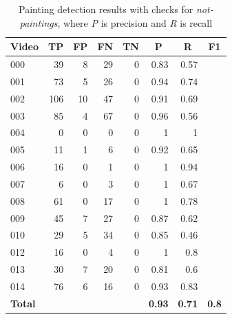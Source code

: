 \documentclass[10pt,twocolumn,letterpaper]{article}
\begin{document}
\begin{table}[]
\begin{center}
\begin{tabular}{lrrrrrrr}
\multicolumn{1}{c}{\textbf{Video}} & \multicolumn{1}{c}{\textbf{TP}} & \multicolumn{1}{c}{\textbf{FP}} & \multicolumn{1}{c}{\textbf{FN}} & \multicolumn{1}{c}{\textbf{TN}} & \multicolumn{1}{c}{\textbf{P}} & \multicolumn{1}{c}{\textbf{R}} & \multicolumn{1}{c}{\textbf{F1}} \\ \hline \hline
000 & 39 & 8 & 29 & 0 & 0.83 & 0.57 &  \\
001 & 73 & 5 & 26 & 0 & 0.94 & 0.74 &  \\
002 & 106 & 10 & 47 & 0 & 0.91 & 0.69 &  \\
003 & 85 & 4 & 67 & 0 & 0.96 & 0.56 &  \\
004 & 0 & 0 & 0 & 0 & 1 & 1 &  \\
005 & 11 & 1 & 6 & 0 & 0.92 & 0.65 &  \\
006 & 16 & 0 & 1 & 0 & 1 & 0.94 &  \\
007 & 6 & 0 & 3 & 0 & 1 & 0.67 &  \\
008 & 61 & 0 & 17 & 0 & 1 & 0.78 &  \\
009 & 45 & 7 & 27 & 0 & 0.87 & 0.62 &  \\
010 & 29 & 5 & 34 & 0 & 0.85 & 0.46 &  \\
012 & 16 & 0 & 4 & 0 & 1 & 0.8 &  \\
013 & 30 & 7 & 20 & 0 & 0.81 & 0.6 &  \\
014 & 76 & 6 & 16 & 0 & 0.93 & 0.83 &  \\ \hline \hline
\textbf{Total} &  &  &  &  & \textbf{0.93} &\textbf{ 0.71} & \textbf{0.8} \\
\end{tabular}
\end{center}
\caption{Painting detection results with checks for \textit{not-paintings}, where \textit{P} is precision and \textit{R} is recall}
\label{tab:PaintingDetectionResults1}
\end{table}
\end{document}
